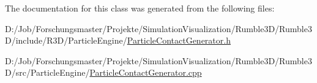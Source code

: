 The documentation for this class was generated from the following files\+:\begin{DoxyCompactItemize}
\item 
D\+:/\+Job/\+Forschungsmaster/\+Projekte/\+Simulation\+Visualization/\+Rumble3\+D/\+Rumble3\+D/include/\+R3\+D/\+Particle\+Engine/\mbox{\hyperlink{_particle_contact_generator_8h}{Particle\+Contact\+Generator.\+h}}\item 
D\+:/\+Job/\+Forschungsmaster/\+Projekte/\+Simulation\+Visualization/\+Rumble3\+D/\+Rumble3\+D/src/\+Particle\+Engine/\mbox{\hyperlink{_particle_contact_generator_8cpp}{Particle\+Contact\+Generator.\+cpp}}\end{DoxyCompactItemize}
